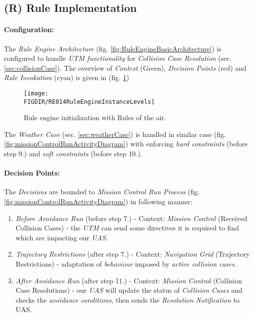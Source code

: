 \subsection{(R) Rule Implementation}\label{sec:ruleImplementation}

\paragraph{Configuration:} The \emph{Rule Engine Architecture} (fig. \ref{fig:RuleEngineBasicArchitecture}) is configured to handle \emph{UTM functionality} for \emph{Collision Case Resolution} (sec. \ref{sec:collisionCase}).  The overview of \emph{Context} (Green), \emph{Decision Points} (red) and \emph{Rule Invokation} (cyan) is given in (fig. \ref{fig:RuleEngineInstanceLevels}) 

\begin{figure}[H]
    \centering
    \texttt{[image: \\FIGDIR/RE014RuleEngineInstanceLevels]} 
    \caption{Rule engine initialization with Rules of the air.}
    \label{fig:RuleEngineInstanceLevels}
\end{figure}

\begin{note}
    The \emph{Weather Case} (sec. \ref{sec:weatherCase}) is handled in similar case (fig. \ref{fig:missionControlRunActivityDiagram}) with enforcing \emph{hard constraints} (before step 9.) and \emph{soft constraints} (before step 10.).
\end{note}


\paragraph{Decision Points:} The \emph{Decisions} are bounded to \emph{Mission Control Run Process} (fig. \ref{fig:missionControlRunActivityDiagram}) in following manner:
\begin{enumerate}
    \item \emph{Before Avoidance Run} (before step 7.) - Context: \emph{Mission Control} (Received Collision Cases) - the \emph{UTM} can send some directives it is required to find which are impacting our \emph{UAS}.
    
    \item \emph{Trajectory Restrictions} (after step 7.) - Context: \emph{Navigation Grid} (Trajectory Restrictions) - adaptation of \emph{behaviour} imposed by \emph{active collision cases}.
    
    \item \emph{After Avoidance Run} (after step 11.) - Context: \emph{Mission Control} (Collision Case Resolutions) - our \emph{UAS} will update the status of \emph{Collision Cases} and checks the \emph{avoidance conditions}, then sends the \emph{Resolution Notification} to UAS.
    
\end{enumerate}

